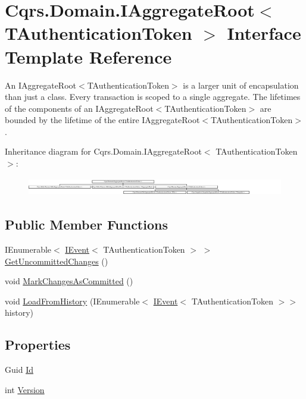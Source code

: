 \hypertarget{interfaceCqrs_1_1Domain_1_1IAggregateRoot}{}\section{Cqrs.\+Domain.\+I\+Aggregate\+Root$<$ T\+Authentication\+Token $>$ Interface Template Reference}
\label{interfaceCqrs_1_1Domain_1_1IAggregateRoot}


An I\+Aggregate\+Root$<$\+T\+Authentication\+Token$>$ is a larger unit of encapsulation than just a class. Every transaction is scoped to a single aggregate. The lifetimes of the components of an I\+Aggregate\+Root$<$\+T\+Authentication\+Token$>$ are bounded by the lifetime of the entire I\+Aggregate\+Root$<$\+T\+Authentication\+Token$>$.  


Inheritance diagram for Cqrs.\+Domain.\+I\+Aggregate\+Root$<$ T\+Authentication\+Token $>$\+:\begin{figure}[H]
\begin{center}
\leavevmode
\includegraphics[height=0.810811cm]{interfaceCqrs_1_1Domain_1_1IAggregateRoot}
\end{center}
\end{figure}
\subsection*{Public Member Functions}
\begin{DoxyCompactItemize}
\item 
I\+Enumerable$<$ \hyperlink{interfaceCqrs_1_1Events_1_1IEvent}{I\+Event}$<$ T\+Authentication\+Token $>$ $>$ \hyperlink{interfaceCqrs_1_1Domain_1_1IAggregateRoot_a22fda414613f5ac0d4371554d7d6473b}{Get\+Uncommitted\+Changes} ()
\item 
void \hyperlink{interfaceCqrs_1_1Domain_1_1IAggregateRoot_af31116870bbf6566b3eec0b8bc02c6de}{Mark\+Changes\+As\+Committed} ()
\item 
void \hyperlink{interfaceCqrs_1_1Domain_1_1IAggregateRoot_afe9329ee26ae68613059189ca64dfe60}{Load\+From\+History} (I\+Enumerable$<$ \hyperlink{interfaceCqrs_1_1Events_1_1IEvent}{I\+Event}$<$ T\+Authentication\+Token $>$$>$ history)
\end{DoxyCompactItemize}
\subsection*{Properties}
\begin{DoxyCompactItemize}
\item 
Guid \hyperlink{interfaceCqrs_1_1Domain_1_1IAggregateRoot_a04aa3198f1371afa345a58e8fcb713d7}{Id}
\item 
int \hyperlink{interfaceCqrs_1_1Domain_1_1IAggregateRoot_ad81adab68c0984330f735a1f5a661aa7}{Version}
\end{DoxyCompactItemize}


